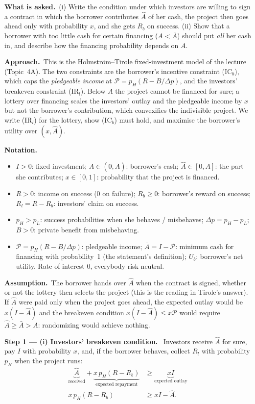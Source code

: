 \documentclass[11pt,a4paper]{article}
\newcommand{\notation}{\par\noindent\textbf{Notation.}}
\newcommand{\step}[2]{\par\medskip\noindent\textbf{Step #1 --- #2.}~}
\newcommand{\assume}{\par\smallskip\noindent\textbf{Assumption.}~}
\newcommand{\asked}{\par\medskip\noindent\textbf{What is asked.}~}
\newcommand{\approach}{\par\smallskip\noindent\textbf{Approach.}~}
\begin{document}
\asked (i) Write the condition under which investors are willing to sign a contract in which the
borrower contributes $\hat A$ of her cash, the project then goes ahead only with probability $x$,
and she gets $R_b$ on success. (ii) Show that a borrower with too little cash for certain financing
($A<\bar A$) should put \emph{all} her cash in, and describe how the financing probability depends
on $A$.

\approach This is the Holmstr\"om--Tirole fixed-investment model of the lecture (Topic~4A). The two
constraints are the borrower's incentive constraint (IC$_b$), which caps the \emph{pledgeable income}
at $\mathcal P=p_H(R-B/\Delta p)$, and the investors' breakeven constraint (IR$_l$). Below $\bar A$
the project cannot be financed for sure; a lottery over financing scales the investors' outlay and
the pledgeable income by $x$ but not the borrower's contribution, which convexifies the
indivisible project. We write (IR$_l$) for the lottery, show (IC$_b$) must hold, and maximise the
borrower's utility over $(x,\hat A)$.

\notation
\begin{itemize}
  \item $I>0$: fixed investment; $A\in(0,\bar A)$: borrower's cash; $\hat A\in[0,A]$: the part she contributes; $x\in[0,1]$: probability that the project is financed.
  \item $R>0$: income on success (0 on failure); $R_b\ge 0$: borrower's reward on success; $R_l=R-R_b$: investors' claim on success.
  \item $p_H>p_L$: success probabilities when she behaves / misbehaves; $\Delta p=p_H-p_L$; $B>0$: private benefit from misbehaving.
  \item $\mathcal P=p_H(R-B/\Delta p)$: pledgeable income; $\bar A=I-\mathcal P$: minimum cash for financing with probability~1 (the statement's definition); $U_b$: borrower's net utility. Rate of interest 0, everybody risk neutral.
\end{itemize}

\assume The borrower hands over $\hat A$ when the contract is signed, whether or not the
lottery then selects the project (this is the reading in Tirole's answer). If $\hat A$ were
paid only when the project goes ahead, the expected outlay would be $x(I-\hat A)$ and the
breakeven condition $x(I-\hat A)\le x\mathcal P$ would require $\hat A\ge\bar A>A$: randomizing
would achieve nothing.

\step{1}{(i) Investors' breakeven condition} Investors receive $\hat A$ for sure, pay $I$ with
probability $x$, and, if the borrower behaves, collect $R_l$ with probability $p_H$ when the
project runs:
\begin{align}
  \underbrace{\hat A}_{\text{received}}+\underbrace{x\,p_H(R-R_b)}_{\text{expected repayment}}
     &\ge \underbrace{x I}_{\text{expected outlay}} \nonumber\\
  x\,p_H(R-R_b) &\ge x I-\hat A. \label{t4e5-IR}
\end{align}
\end{document}
